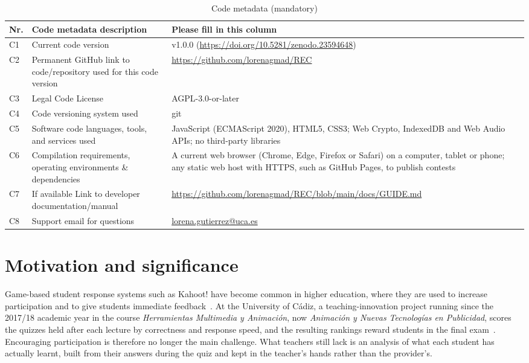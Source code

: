 \documentclass[preprint,12pt, a4paper]{elsarticle}
\begin{document}
\begin{table}[!h]
\small
\begin{tabular}{|l|p{5.6cm}|p{6.4cm}|}
\hline
\textbf{Nr.} & \textbf{Code metadata description} & \textbf{Please fill in this column} \\
\hline
C1 & Current code version & v1.0.0 (\url{https://doi.org/10.5281/zenodo.23594648}) \\
\hline
C2 & Permanent GitHub link to code/repository used for this code version & \url{https://github.com/lorenagmad/REC} \\
\hline
C3 & Legal Code License & AGPL-3.0-or-later \\
\hline
C4 & Code versioning system used & git \\
\hline
C5 & Software code languages, tools, and services used & JavaScript (ECMAScript 2020), HTML5, CSS3; Web Crypto, IndexedDB and Web Audio APIs; no third-party libraries \\
\hline
C6 & Compilation requirements, operating environments \& dependencies & A current web browser (Chrome, Edge, Firefox or Safari) on a computer, tablet or phone; any static web host with HTTPS, such as GitHub Pages, to publish contests \\
\hline
C7 & If available Link to developer documentation/manual & \url{https://github.com/lorenagmad/REC/blob/main/docs/GUIDE.md} \\
\hline
C8 & Support email for questions & \href{mailto:lorena.gutierrez@uca.es}{lorena.gutierrez@uca.es} \\
\hline
\end{tabular}
\caption{Code metadata (mandatory)}
\label{tab:codemetadata}
\end{table}

\section{Motivation and significance}
\label{sec:motivation}

Game-based student response systems such as Kahoot! have become common in higher education, where they are used to increase participation and to give students immediate feedback~\cite{wang2020}. At the University of Cádiz, a teaching-innovation project running since the 2017/18 academic year in the course \emph{Herramientas Multimedia y Animación}, now \emph{Animación y Nuevas Tecnologías en Publicidad}, scores the quizzes held after each lecture by correctness and response speed, and the resulting rankings reward students in the final exam~\cite{gutierrez2018}. Encouraging participation is therefore no longer the main challenge. What teachers still lack is an analysis of what each student has actually learnt, built from their answers during the quiz and kept in the teacher's hands rather than the provider's.
\end{document}
